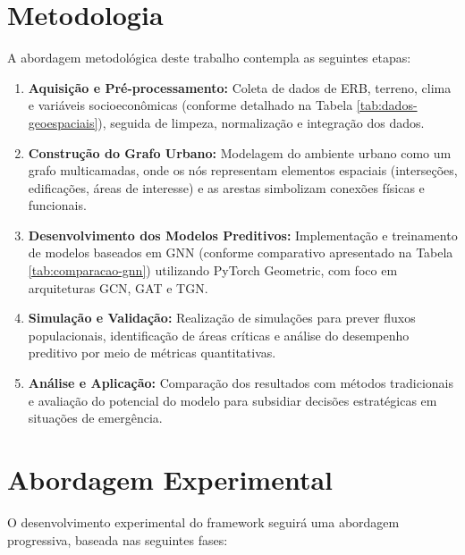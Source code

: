 \section{Metodologia}
A abordagem metodológica deste trabalho contempla as seguintes etapas:
\begin{enumerate}[noitemsep]
    \item \textbf{Aquisição e Pré-processamento:} Coleta de dados de \gls{ERB}, terreno, clima e variáveis socioeconômicas (conforme detalhado na Tabela \ref{tab:dados-geoespaciais}), seguida de limpeza, normalização e integração dos dados.
    
    \item \textbf{Construção do Grafo Urbano:} Modelagem do ambiente urbano como um grafo multicamadas, onde os nós representam elementos espaciais (interseções, edificações, áreas de interesse) e as arestas simbolizam conexões físicas e funcionais.
    
    \item \textbf{Desenvolvimento dos Modelos Preditivos:} Implementação e treinamento de modelos baseados em \gls{GNN} (conforme comparativo apresentado na Tabela \ref{tab:comparacao-gnn}) utilizando PyTorch Geometric, com foco em arquiteturas GCN, GAT e TGN.
    
    \item \textbf{Simulação e Validação:} Realização de simulações para prever fluxos populacionais, identificação de áreas críticas e análise do desempenho preditivo por meio de métricas quantitativas.
    
    \item \textbf{Análise e Aplicação:} Comparação dos resultados com métodos tradicionais e avaliação do potencial do modelo para subsidiar decisões estratégicas em situações de emergência.
\end{enumerate}

\section{Abordagem Experimental}
\label{sec:abordagem-experimental}

O desenvolvimento experimental do framework seguirá uma abordagem progressiva, baseada nas seguintes fases:

